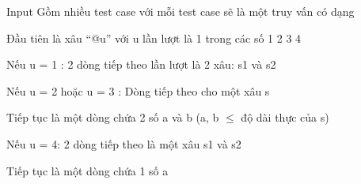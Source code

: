 Input
Gồm nhiều test case với mỗi test case sẽ là một truy vấn có dạng

Đầu tiên là xâu “@u” với u lần lượt là 1 trong các số 1 2 3 4

Nếu u = 1 : 2 dòng tiếp theo lần lượt là 2 xâu: s1 và s2

Nếu u = 2 hoặc u = 3 : Dòng tiếp theo cho một xâu s

Tiếp tục là một dòng chứa 2 số a và b (a, b  $\le$  độ dài thực của s)

Nếu u = 4: 2 dòng tiếp theo là một xâu s1 và s2

Tiếp tục là một dòng chứa 1 số a